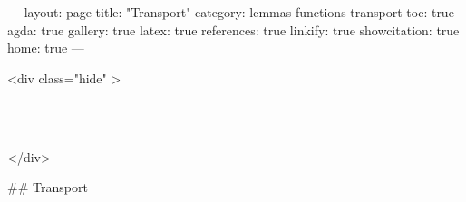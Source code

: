 
---
layout: page
title: "Transport"
category: lemmas functions transport
toc: true
agda: true
gallery: true
latex: true
references: true
linkify: true
showcitation: true
home: true
---

<div class="hide" >
\begin{code}%
\>[0]\AgdaSymbol{\{-\#}\AgdaSpace{}%
\AgdaSpace{}%
\AgdaSpace{}%
\AgdaSymbol{\#-\}}\<%
\\
\>[0]\AgdaSpace{}%
\AgdaSpace{}%
\AgdaSpace{}%
\<%
\\
\>[0]\AgdaSpace{}%
\AgdaSpace{}%
\AgdaSpace{}%
\<%
\end{code}
</div>

## Transport


